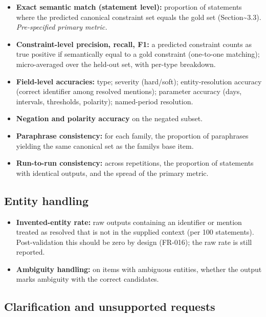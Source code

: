 \documentclass[
  11pt,a4paper,oneside]{report}
\providecommand{\tightlist}{%
  \setlength{\itemsep}{0pt}\setlength{\parskip}{0pt}}
\begin{document}
\begin{itemize}
\tightlist
\item
  \textbf{Exact semantic match (statement level):} proportion of
  statements where the predicted canonical constraint set equals the
  gold set (Section\textasciitilde3.3). \emph{Pre-specified primary
  metric.}
\item
  \textbf{Constraint-level precision, recall, F1:} a predicted
  constraint counts as true positive if semantically equal to a gold
  constraint (one-to-one matching); micro-averaged over the held-out
  set, with per-type breakdown.
\item
  \textbf{Field-level accuracies:} type; severity (hard/soft);
  entity-resolution accuracy (correct identifier among resolved
  mentions); parameter accuracy (days, intervals, thresholds, polarity);
  named-period resolution.
\item
  \textbf{Negation and polarity accuracy} on the negated subset.
\item
  \textbf{Paraphrase consistency:} for each family, the proportion of
  paraphrases yielding the same canonical set as the
  family\textquotesingle s base item.
\item
  \textbf{Run-to-run consistency:} across repetitions, the proportion of
  statements with identical outputs, and the spread of the primary
  metric.
\end{itemize}

\hypertarget{entity-handling}{%
\subsection{Entity handling}\label{entity-handling}}

\begin{itemize}
\tightlist
\item
  \textbf{Invented-entity rate:} raw outputs containing an identifier or
  mention treated as resolved that is not in the supplied context (per
  100 statements). Post-validation this should be zero by design
  (FR-016); the raw rate is still reported.
\item
  \textbf{Ambiguity handling:} on items with ambiguous entities, whether
  the output marks ambiguity with the correct candidates.
\end{itemize}

\hypertarget{clarification-and-unsupported-requests}{%
\subsection{Clarification and unsupported
requests}\label{clarification-and-unsupported-requests}}
\end{document}
